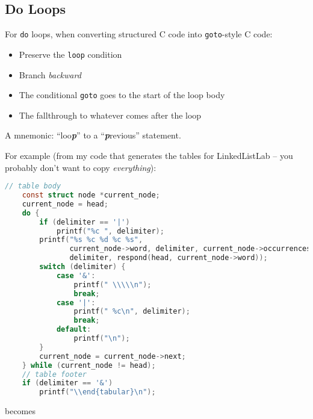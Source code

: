 \documentclass{article}
\begin{document}
\subsection{Do Loops}

For \lstinline{do} loops, when converting structured C code into \lstinline{goto}-style C code:
\begin{itemize}
    \item Preserve the \lstinline{loop} condition
    \item Branch \textit{backward}
    \item The conditional \lstinline{goto} goes to the start of the loop body
    \item The fallthrough to whatever comes after the loop
\end{itemize}
A mnemonic: ``loo\textbf{\textit{p}}'' to a ``\textbf{\textit{p}}revious'' statement.

For example (from my code that generates the tables for LinkedListLab -- you probably don't want to copy \textit{everything}):

\begin{lstlisting}[language=C, linebackgroundcolor={
    %    \ifodd\value{lstnumber}\color{green}\fi
    \ifnum\value{lstnumber}=4 \color{green}\fi,
    \ifnum\value{lstnumber}=21 \color{green}\fi,
    \ifnum\value{lstnumber}=5 \color{yellow}\fi,
    \ifnum\value{lstnumber}=23 \color{magenta}\fi,
}]
    // table body
    const struct node *current_node;
    current_node = head;
    do {
        if (delimiter == '|')
            printf("%c ", delimiter);
        printf("%s %c %d %c %s",
               current_node->word, delimiter, current_node->occurrences,
               delimiter, respond(head, current_node->word));
        switch (delimiter) {
            case '&':
                printf(" \\\\\n");
                break;
            case '|':
                printf(" %c\n", delimiter);
                break;
            default:
                printf("\n");
        }
        current_node = current_node->next;
    } while (current_node != head);
    // table footer
    if (delimiter == '&')
        printf("\\end{tabular}\n");
\end{lstlisting}
\newpage
becomes
\end{document}
